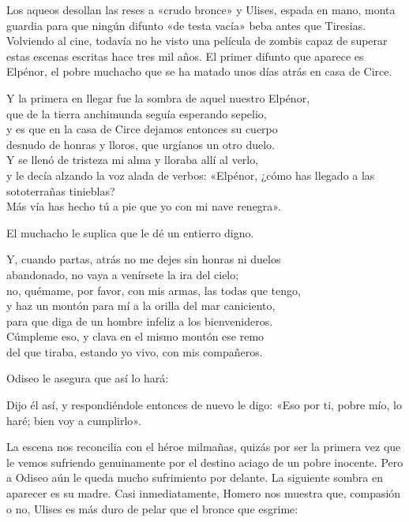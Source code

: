 Los aqueos desollan las reses a «crudo bronce» y Ulises, espada en mano, monta guardia para que ningún difunto «de testa vacía» beba antes que Tiresias. Volviendo al cine, todavía no he visto una película de zombis capaz de superar estas escenas escritas hace tres mil años. El primer difunto que aparece es Elpénor, el pobre muchacho que se ha matado unos días atrás en casa de Circe.

\begin{versocita}
Y la primera en llegar fue la sombra de aquel nuestro Elpénor,\\
que de la tierra anchimunda seguía esperando sepelio,\\
y es que en la casa de Circe dejamos entonces su cuerpo\\
desnudo de honras y lloros, que urgíanos un otro duelo.\\
Y se llenó de tristeza mi alma y lloraba allí al verlo,\\
y le decía alzando la voz alada de verbos:
\stanzabreak
«Elpénor, ¿cómo has llegado a las sototerrañas tinieblas?\\
Más vía has hecho tú a pie que yo con mi nave renegra».
\end{versocita}

El muchacho le suplica que le dé un entierro digno.

\begin{versocita}
Y, cuando partas, atrás no me dejes sin honras ni duelos\\
abandonado, no vaya a venírsete la ira del cielo;\\
no, quémame, por favor, con mis armas, las todas que tengo,\\
y haz un montón para mí a la orilla del mar caniciento,\\
para que diga de un hombre infeliz a los bienvenideros.\\
Cúmpleme eso, y clava en el mismo montón ese remo\\
del que tiraba, estando yo vivo, con mis compañeros.
\end{versocita}

Odiseo le asegura que así lo hará:

\begin{versocita}
Dijo él así, y respondiéndole entonces de nuevo le digo:
\stanzabreak
«Eso por ti, pobre mío, lo haré; bien voy a cumplirlo».
\end{versocita}

La escena nos reconcilia con el héroe milmañas, quizás por ser la primera vez que le vemos sufriendo genuinamente por el destino aciago de un pobre inocente. Pero a Odiseo aún le queda mucho sufrimiento por delante. La siguiente sombra en aparecer es su madre. Casi inmediatamente, Homero nos muestra que, compasión o no, Ulises es más duro de pelar que el bronce que esgrime:

